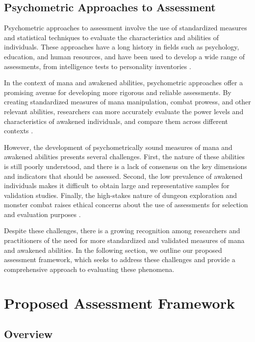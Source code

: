 \documentclass[12pt, a4paper]{article}
\begin{document}
\subsection{Psychometric Approaches to Assessment}

Psychometric approaches to assessment involve the use of standardized measures and statistical techniques to evaluate the characteristics and abilities of individuals. These approaches have a long history in fields such as psychology, education, and human resources, and have been used to develop a wide range of assessments, from intelligence tests to personality inventories \citep{Furr2014}.

In the context of mana and awakened abilities, psychometric approaches offer a promising avenue for developing more rigorous and reliable assessments. By creating standardized measures of mana manipulation, combat prowess, and other relevant abilities, researchers can more accurately evaluate the power levels and characteristics of awakened individuals, and compare them across different contexts \citep{Choi2027}.

However, the development of psychometrically sound measures of mana and awakened abilities presents several challenges. First, the nature of these abilities is still poorly understood, and there is a lack of consensus on the key dimensions and indicators that should be assessed. Second, the low prevalence of awakened individuals makes it difficult to obtain large and representative samples for validation studies. Finally, the high-stakes nature of dungeon exploration and monster combat raises ethical concerns about the use of assessments for selection and evaluation purposes \citep{Park2027}.

Despite these challenges, there is a growing recognition among researchers and practitioners of the need for more standardized and validated measures of mana and awakened abilities. In the following section, we outline our proposed assessment framework, which seeks to address these challenges and provide a comprehensive approach to evaluating these phenomena.

\section{Proposed Assessment Framework}

\subsection{Overview}
\end{document}
